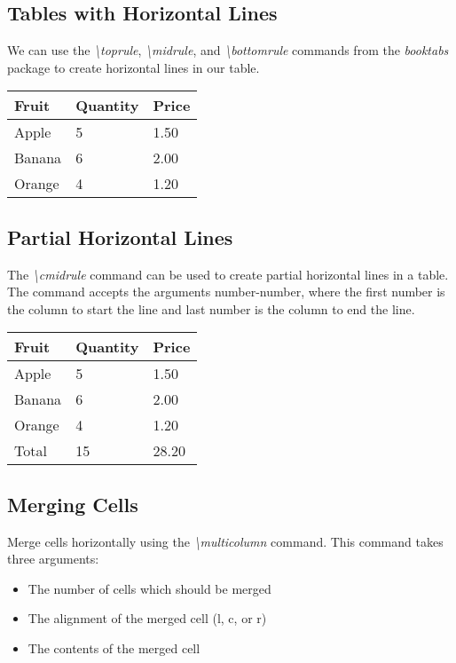 \documentclass{article}
\newcommand{\cmd}[1]{\textit{#1}}
\begin{document}
\subsection{Tables with Horizontal Lines}

We can use the \cmd{\textbackslash toprule}, \cmd{\textbackslash midrule}, and
\cmd{\textbackslash bottomrule} commands from the \cmd{booktabs} package to create horizontal
lines in our table.

\begin{tabular}{*{3}{l}}
  \toprule
  Fruit  & Quantity & Price \\
  \midrule
  Apple  & 5        & 1.50  \\
  Banana & 6        & 2.00  \\
  Orange & 4        & 1.20  \\
  \bottomrule
\end{tabular}

\subsection{Partial Horizontal Lines}

The \cmd{\textbackslash cmidrule} command can be used to create partial horizontal lines in a
table. The command accepts the arguments {number-number}, where the first number is the column to
start the line and last number is the column to end the line.

\begin{tabular}{*{3}{l}}
  \toprule
  Fruit  & Quantity &  Price \\
  \midrule
  Apple  & 5        &  1.50  \\
  Banana & 6        &  2.00  \\
  Orange & 4        &  1.20  \\
  \cmidrule{3-3}
  Total & 15        & 28.20  \\
  \bottomrule
\end{tabular}

\subsection{Merging Cells}

Merge cells horizontally using the \cmd{\textbackslash multicolumn} command. This command takes
three arguments:

\begin{itemize}
  \item The number of cells which should be merged
  \item The alignment of the merged cell (l, c, or r)
  \item The contents of the merged cell
\end{itemize}
\end{document}
